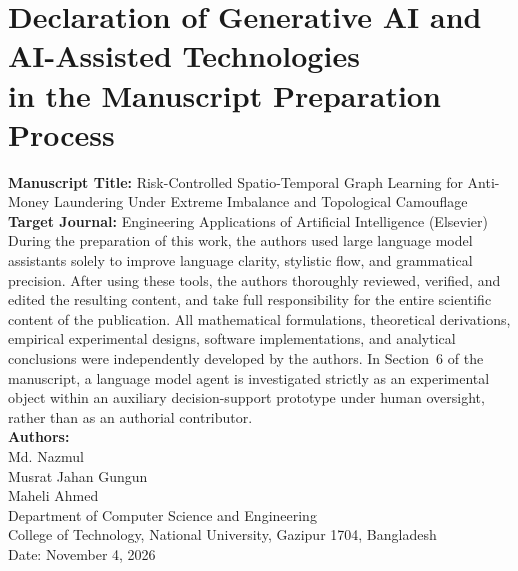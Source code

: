\documentclass[a4paper,11pt]{article}
\begin{document}
\section*{Declaration of Generative AI and AI-Assisted Technologies\\ in the Manuscript Preparation Process}

\noindent\textbf{Manuscript Title:} Risk-Controlled Spatio-Temporal Graph Learning for Anti-Money Laundering Under Extreme Imbalance and Topological Camouflage\\[1.5ex]
\textbf{Target Journal:} Engineering Applications of Artificial Intelligence (Elsevier)\\[2.0ex]

\noindent During the preparation of this work, the authors used large language model assistants solely to improve language clarity, stylistic flow, and grammatical precision. After using these tools, the authors thoroughly reviewed, verified, and edited the resulting content, and take full responsibility for the entire scientific content of the publication. All mathematical formulations, theoretical derivations, empirical experimental designs, software implementations, and analytical conclusions were independently developed by the authors. In Section~6 of the manuscript, a language model agent is investigated strictly as an experimental object within an auxiliary decision-support prototype under human oversight, rather than as an authorial contributor.\\[3.0ex]

\noindent\textbf{Authors:}\\
Md. Nazmul\\
Musrat Jahan Gungun\\
Maheli Ahmed\\[2.0ex]
Department of Computer Science and Engineering\\
College of Technology, National University, Gazipur 1704, Bangladesh\\[2.0ex]
Date: November 4, 2026
\end{document}
